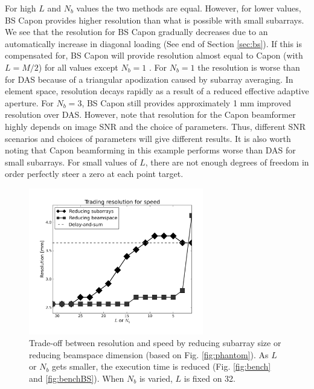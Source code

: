 \documentclass[journal]{IEEEtran}
\begin{document}
For high $L$ and $N_b$ values the two methods are equal. However, for lower values, BS Capon provides higher resolution than what is possible with small subarrays. We see that the resolution for BS Capon gradually decreases due to an automatically increase in diagonal loading (See end of Section \ref{sec:bs}). If this is compensated for, BS Capon will provide resolution almost equal to Capon (with $L=M/2$) for all values except $N_b=1$ \cite{Nilsen2009}. For $N_b=1$ the resolution is worse than for DAS because of a triangular apodization caused by subarray averaging. In element space, resolution decays rapidly as a result of a reduced effective adaptive aperture. For $N_b=3$, BS Capon still provides approximately 1 mm improved resolution over DAS. However, note that resolution for the Capon beamformer highly depends on image SNR and the choice of parameters. Thus, different SNR scenarios and choices of parameters will give different results. It is also worth noting that Capon beamforming in this example performs worse than DAS for small subarrays. For small values of $L$, there are not enough degrees of freedom in order perfectly steer a zero at each point target.

\begin{figure}
\centering
\includegraphics[width=3in]{gfx/speed_res_trade.png}
\caption{Trade-off between resolution and speed by reducing subarray size or reducing beamspace dimension (based on Fig. \ref{fig:phantom}). As $L$ or $N_b$ gets smaller, the execution time is reduced (Fig. \ref{fig:bench} and \ref{fig:benchBS}). When $N_b$ is varied, $L$ is fixed on 32.}
\label{fig:speed_res_trade}
\end{figure}
\end{document}
